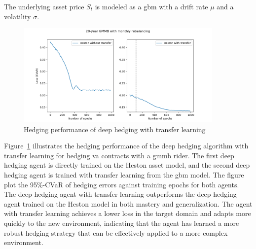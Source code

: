 The underlying asset price $S_t$ is modeled as a \gls{gbm} with a drift rate $\mu$ and a volatility $\sigma$.

\begin{figure}
    \centering
    \includegraphics[width=0.9\textwidth]{./futureWork/figures/CVaR_histories.png}
    \caption{Hedging performance of deep hedging with transfer learning}
    \label{fig3:dh-transfers}
\end{figure}

Figure~\ref{fig3:dh-transfers} illustrates the hedging performance of the deep hedging algorithm with transfer learning for hedging \gls{va} contracts with a \gls{gmmb} rider.
The first deep hedging agent is directly trained on the Heston asset model, and the second deep hedging agent is trained with transfer learning from the \gls{gbm} model.
The figure plot the 95\%-CVaR of hedging errors against training epochs for both agents.
The deep hedging agent with transfer learning outperforms the deep hedging agent trained on the Heston model in both mastery and generalization.
The agent with transfer learning achieves a lower loss in the target domain and adapts more quickly to the new environment, indicating that the agent has learned a more robust hedging strategy that can be effectively applied to a more complex environment.

